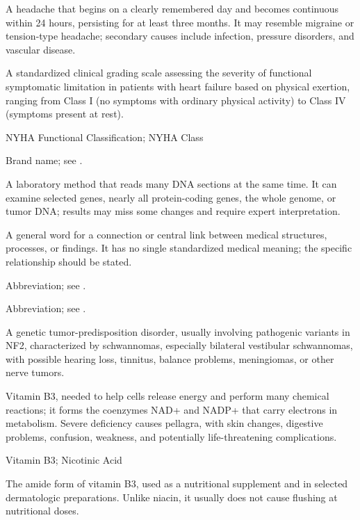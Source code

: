  A headache that begins on a clearly remembered day and becomes continuous within 24 hours, persisting for
at least three months. It may resemble migraine or tension-type headache; secondary causes include infection, pressure disorders, and vascular disease.

 A standardized clinical grading scale assessing the severity of functional symptomatic limitation in patients with heart failure based on physical exertion, ranging from Class I (no symptoms with ordinary physical activity) to Class IV (symptoms present at rest).

\synonyms
NYHA Functional Classification; NYHA Class

 Brand name; see .

 A laboratory method that reads many DNA sections at the same time. It can examine selected genes, nearly all protein-coding genes, the whole genome, or tumor DNA; results may miss some changes and require expert interpretation.

 A general word for a connection or central link between medical structures, processes, or findings. It has no single standardized medical meaning; the specific relationship should be stated.

 Abbreviation; see .

 Abbreviation; see .

 A genetic tumor-predisposition disorder, usually involving pathogenic variants in NF2, characterized by schwannomas, especially bilateral vestibular schwannomas, with possible hearing loss, tinnitus, balance problems, meningiomas, or other nerve tumors.

 Vitamin B3, needed to help cells release energy and perform many chemical reactions; it forms the coenzymes NAD+ and NADP+ that carry electrons in metabolism. Severe deficiency causes pellagra, with skin changes, digestive problems, confusion, weakness, and potentially life-threatening complications.

\synonyms
Vitamin B3; Nicotinic Acid

 The amide form of vitamin B3, used as a nutritional supplement and in selected dermatologic preparations. Unlike niacin, it usually does not cause flushing at nutritional doses.

